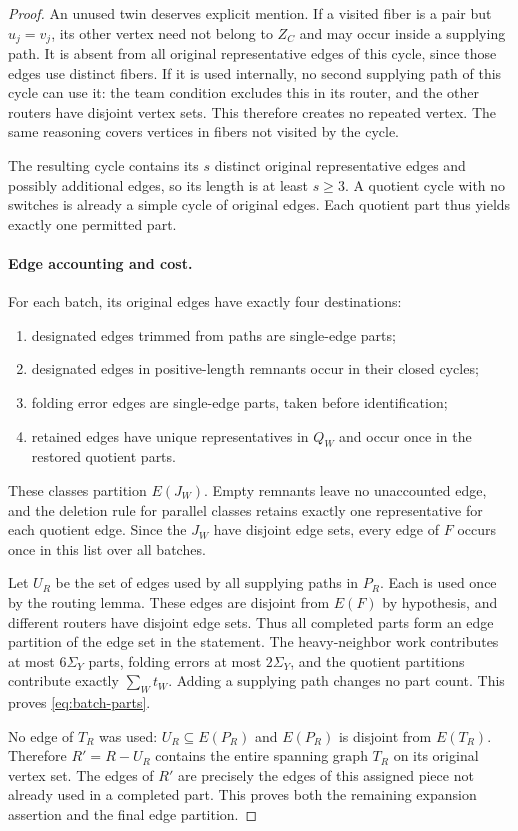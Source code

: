 \begin{proof}
An unused twin deserves explicit mention.  If a visited fiber is a pair
but $u_j=v_j$, its other vertex need not belong to $Z_C$ and may occur
inside a supplying path.  It is absent from all original representative
edges of this cycle, since those edges use distinct fibers.  If it is
used internally, no second supplying path of this cycle can use it:
the team condition excludes this in its router, and the other routers
have disjoint vertex sets.  This therefore creates no repeated vertex.
The same reasoning covers vertices in fibers not visited by the cycle.

The resulting cycle contains its $s$ distinct original representative
edges and possibly additional edges, so its length is at least
$s\ge3$.  A quotient cycle with no switches is already a simple cycle
of original edges.  Each quotient part thus yields exactly one permitted
part.

\paragraph{Edge accounting and cost.}
For each batch, its original edges have exactly four destinations:
\begin{enumerate}
 \item designated edges trimmed from paths are single-edge parts;
 \item designated edges in positive-length remnants occur in their
       closed cycles;
 \item folding error edges are single-edge parts, taken before
       identification;
 \item retained edges have unique representatives in $Q_W$ and occur
       once in the restored quotient parts.
\end{enumerate}
These classes partition $E(J_W)$.  Empty remnants leave no unaccounted
edge, and the deletion rule for parallel classes retains exactly one
representative for each quotient edge.  Since the $J_W$ have disjoint
edge sets, every edge of $F$ occurs once in this list over all batches.

Let $U_R$ be the set of edges used by all supplying paths in $P_R$.
Each is used once by the routing lemma.  These edges are disjoint from
$E(F)$ by hypothesis, and different routers have disjoint edge sets.
Thus all completed parts form an edge partition of the edge set in the
statement.  The heavy-neighbor work contributes at most $6\Sigma_Y$
parts, folding errors at most $2\Sigma_Y$, and the quotient partitions
contribute exactly $\sum_W t_W$.  Adding a supplying path changes no
part count.  This proves \eqref{eq:batch-parts}.

No edge of $T_R$ was used: $U_R\subseteq E(P_R)$ and $E(P_R)$ is
disjoint from $E(T_R)$.  Therefore $R'=R-U_R$ contains the entire
spanning graph $T_R$ on its original vertex set.  The edges of $R'$
are precisely the edges of this assigned piece not already used in a
completed part.  This proves both the remaining expansion assertion
and the final edge partition.
\end{proof}
